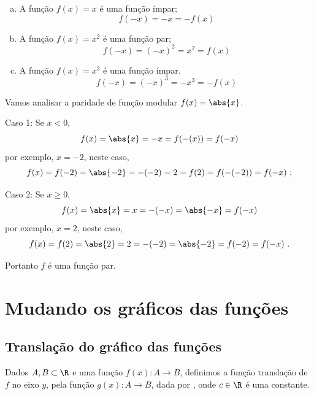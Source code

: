  \begin{exem}
  \begin{enumerate}[a)]
   \item A função $f(x)= x$ é uma função ímpar;
\begin{equation}
f(-x)= -x= -f(x) 
\end{equation}
   \item A função $f(x)= x^2$ é uma função par;
\begin{equation}
f(-x)= (-x)^2= x^2 = f(x) 
\end{equation}
   \item A função $f(x)= x^3$ é uma função ímpar.
\begin{equation}
f(-x)= (-x)^3= -x^3= -f(x)
\end{equation}
  \end{enumerate}
 \end{exem}

 \begin{exem}
  Vamos analisar a paridade de função modular $f(x)= \abs{x}$.

  Caso 1: Se $x < 0$,
\begin{equation}
f(x)= \abs{x}= -x= f(-(x))= f(-x)
\end{equation}
  por exemplo, $x= -2$, neste caso,
\begin{equation}
f(x)= f(-2)= \abs{-2}= -(-2)= 2= f(2)= f(-(-2))= f(-x) \ ;
\end{equation}

  Caso 2: Se $x \geq 0$,
\begin{equation}
f(x)= \abs{x}= x= -(-x)= \abs{-x}= f(-x)
\end{equation}
  por exemplo, $x= 2$, neste caso,
\begin{equation}
f(x)= f(2)= \abs{2}= 2= -(-2)= \abs{-2}= f(-2)= f(-x) \ .
\end{equation}

  Portanto $f$ é uma função par.
 \end{exem}


\newpage
 \section{Mudando os gráficos das funções}

 \subsection{Translação do gráfico das funções}

 Dados $A, B \subset \R$ e uma função $f(x): A \to B$, definimos a função translação de $f$ no eixo $y$, pela função $g(x): A \to B$, dada por , onde $c \in \R$ é uma constante.

